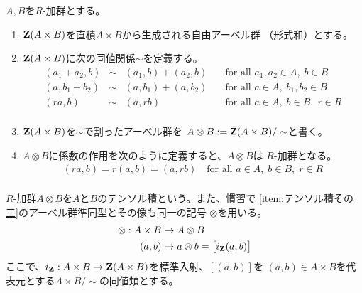 {	\begin{definition}[テンソル積]\label{def:テンソル積} %
		$A,B$を$R$-加群とする。
		\begin{enumerate}\setlength{\itemsep}{-1mm} %
			\item\label{item:テンソル積その一} 
			$\mathbf{Z}(A\times B)$を直積$A\times B$から生成される自由アーベル群
			（形式和）とする。
			\item\label{item:テンソル積その二} 
			$\mathbf{Z}(A\times B)$に次の同値関係$\sim$を定義する。
			\begin{equation*}\begin{array}{rcll}
				(a_1 + a_2, b) &\sim& (a_1, b) + (a_2, b)
					& \quad\text{for all }a_1,a_2\in A,\; b\in B \\
				(a, b_1 + b_2) &\sim& (a, b_1) + (a, b_2)
					& \quad\text{for all }a\in A,\; b_1,b_2\in B \\
				(ra, b) &\sim& (a,rb)
					& \quad\text{for all }a\in A,\; b\in B,\; r\in R \\
			\end{array}\end{equation*}
			\item\label{item:テンソル積その三} 
			$\mathbf{Z}(A\times B)$を$\sim$で割ったアーベル群を
			$A\otimes B:=\mathbf{Z}(A\times B)/\sim$と書く。
			\item\label{item:テンソル積その四} 
			$A\otimes B$に係数の作用を次のように定義すると、$A\otimes B$は
			$R$-加群となる。
			\begin{equation*}\begin{split}
				(ra,b) = r(a,b) = (a,rb)
				\quad\text{for all }a\in A,\; b\in B,\; r\in R \\
			\end{split}\end{equation*}
		\end{enumerate} %
		$R$-加群$A\otimes B$を$A$と$B$のテンソル積という。また、慣習で
		\ref{item:テンソル積その三}のアーベル群準同型とその像も同一の記号
		$\otimes$を用いる。
		\begin{equation*}\begin{split}
			\otimes: A\times B &\to A\otimes B \\
			(a,b) &\mapsto  a\otimes b = \bigl[i_{\mathbf{Z}}(a,b)\bigr]
		\end{split}\end{equation*}
		ここで、$i_{\mathbf{Z}}: A\times B\to\mathbf{Z}(A\times B)$を標準入射、$[(a,b)]$を
		$(a,b)\in A\times B$を代表元とする$A\times B/\sim$の同値類とする。
	\end{definition} %

}
